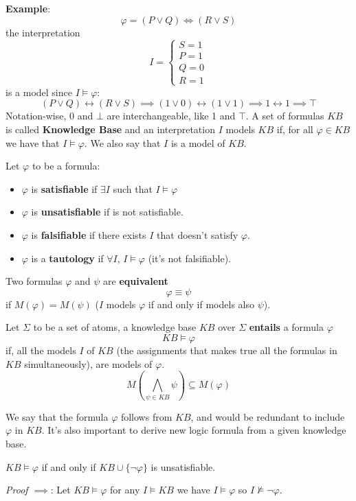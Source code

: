 \documentclass[10pt, letterpaper]{report}
\begin{document}
\textbf{Example}:\begin{equation}
    \varphi = (P\lor Q)\iff (R\lor S) 
\end{equation}
the interpretation \begin{equation}
    I=\begin{cases}
        S=1\\
        P=1\\ 
        Q=0\\ 
        R=1
    \end{cases}
\end{equation}
is a model since $I\models \varphi$:\begin{equation}
    (P\lor Q)\leftrightarrow (R\lor S)  \implies (1\lor 0)\leftrightarrow (1 \lor 1) \implies 1 \leftrightarrow 1 \implies \top
\end{equation}
Notation-wise, 0 and $\bot$ are interchangeable, like 1 and $\top$. A set of formulas $KB$ is called \textbf{Knowledge Base} and an interpretation $I$ models $KB$ if, for all $\varphi\in KB$ we have that $I\models \varphi$. We also say that $I$ is a model of $KB$.
\begin{definition}
    Let $\varphi$ to be a formula:\begin{itemize}
        \item $\varphi$ is \textbf{satisfiable} if $\exists I$ such that $I\models \varphi$ 
        \item $\varphi$ is \textbf{unsatisfiable} if is not satisfiable.
        \item $\varphi$ is \textbf{falsifiable} if there exists $I$ that doesn't satisfy $\varphi$.
        \item $\varphi$ is a \textbf{tautology} if $\forall I$, $I\models \varphi$ (it's not falsifiable).
    \end{itemize}
\end{definition}
\begin{definition}
    Two formulas $\varphi$ and $\psi$ are \textbf{equivalent}$$\varphi\equiv \psi $$ if $M(\varphi)=M(\psi)$ ($I$ models $\varphi$ if and only if models also $\psi$).
\end{definition}
\begin{definition}
    Let $\Sigma$ to be a set of atoms, a knowledge base $KB$ over $\Sigma$ \textbf{entails} a formula $\varphi$ $$KB\models \varphi $$
    if, all the models $I$ of $KB$ (the assignments that makes true all the formulas in $KB$ simultaneously), are models of $\varphi$. 
    $$ M(\bigwedge_{\psi\in KB}\psi)\subseteq M(\varphi)$$
\end{definition}
We say that the formula $\varphi$ follows from $KB$, and would be redundant to include $\varphi$ in $KB$. It's also important to derive new logic formula from a given knowledge base.
\begin{theorem}
    $KB\models \varphi$ if and only if $KB\cup\{\lnot \varphi\}$ is unsatisfiable.
\end{theorem}
\textit{Proof $\implies$}: Let $KB\models \varphi$ for any $I\models KB$ we have $I\models \varphi$ so $I\not\models \lnot \varphi$.
\end{document}
